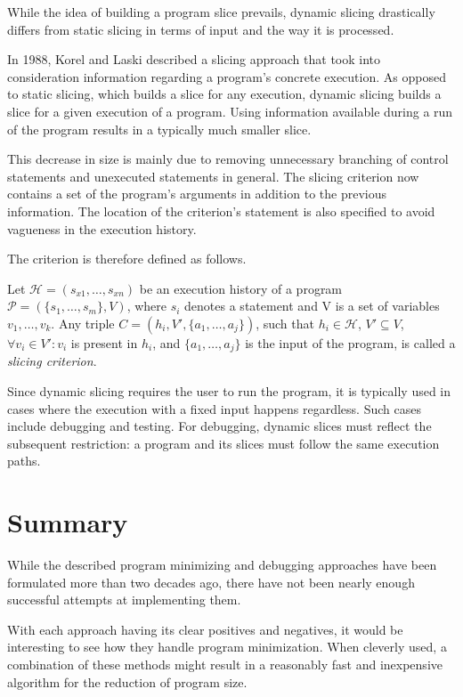 While the idea of building a program slice prevails, dynamic slicing 
drastically differs from static slicing in terms of input and the way
it is processed. 

In 1988, Korel and Laski described a slicing approach that took into 
consideration information regarding a program's concrete execution. 
As opposed to static slicing, which builds a slice for any execution, 
dynamic slicing builds a slice for a given execution of a program. 
Using information available during a run of the program 
results in a typically much smaller slice.


This decrease in size is mainly due to removing unnecessary 
branching of control statements and unexecuted statements in general. 
The slicing criterion now contains a set of the program's 
arguments in addition to the previous information. 
The location of the criterion's statement is also specified to avoid 
vagueness in the execution history. 

The criterion is therefore defined as follows.

\begin{defn}\label{def02:5}
  Let $\mathcal{H} = (s_{x1},\dots,s_{xn})$ be an execution history of a program 
  $\mathcal{P} = (\{s_1,\dots,s_m\}, V)$, where $s_i$ denotes a statement
  and V is a set of variables $v_1,\dots,v_k$.
  Any triple $C = (h_i, V', \{a_1,\dots,a_j\})$, such that $h_i \in \mathcal{H}$,
  $V' \subseteq V$, $\forall v_i \in V': v_i$ is present in $h_i$,
  and $\{a_1,\dots,a_j\}$ is the input of the program,
  is called a \emph{slicing criterion}.
\end{defn}

Since dynamic slicing requires the user to run the program, 
it is typically used in cases where the execution with a fixed 
input happens regardless. Such cases include debugging and testing. 
For debugging, dynamic slices must reflect the subsequent restriction: 
a program and its slices must follow the same execution paths.

\section{Summary}

While the described program minimizing and debugging approaches have been 
formulated more than two decades ago, there have not been nearly enough 
successful attempts at implementing them. 

With each approach having its clear positives and negatives, 
it would be interesting to see how they handle program minimization. 
When cleverly used, a combination of these methods might 
result in a reasonably fast and inexpensive algorithm 
for the reduction of program size.
